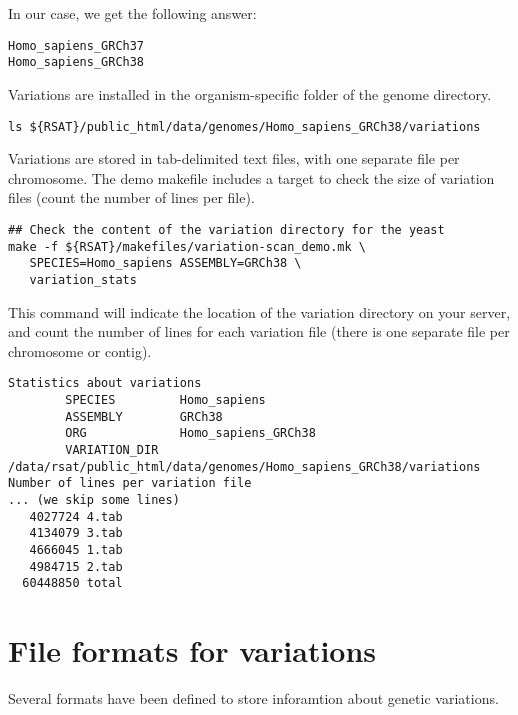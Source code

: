 In our case, we get the following answer:

{\color{OliveGreen} \begin{footnotesize} 
\begin{verbatim}
Homo_sapiens_GRCh37
Homo_sapiens_GRCh38
\end{verbatim} \end{footnotesize}
}

Variations are installed in the organism-specific folder of the genome
directory.

\begin{lstlisting}
ls ${RSAT}/public_html/data/genomes/Homo_sapiens_GRCh38/variations
\end{lstlisting}

Variations are stored in tab-delimited text files, with one separate file
per chromosome.  The demo makefile includes a target to check the size
of variation files (count the number of lines per file).

\begin{lstlisting}
## Check the content of the variation directory for the yeast
make -f ${RSAT}/makefiles/variation-scan_demo.mk \
   SPECIES=Homo_sapiens ASSEMBLY=GRCh38 \
   variation_stats
\end{lstlisting}

This command will indicate the location of the variation directory on
your \RSAT server, and count the number of lines for each variation
file (there is one separate file per chromosome or contig).


{\color{OliveGreen} \begin{footnotesize} 
\begin{verbatim}
Statistics about variations
        SPECIES         Homo_sapiens
        ASSEMBLY        GRCh38
        ORG             Homo_sapiens_GRCh38
        VARIATION_DIR   /data/rsat/public_html/data/genomes/Homo_sapiens_GRCh38/variations
Number of lines per variation file
... (we skip some lines)
   4027724 4.tab
   4134079 3.tab
   4666045 1.tab
   4984715 2.tab
  60448850 total
\end{verbatim} \end{footnotesize}
}

\section{File formats for variations}

Several formats have been defined to store inforamtion about genetic
variations. 


